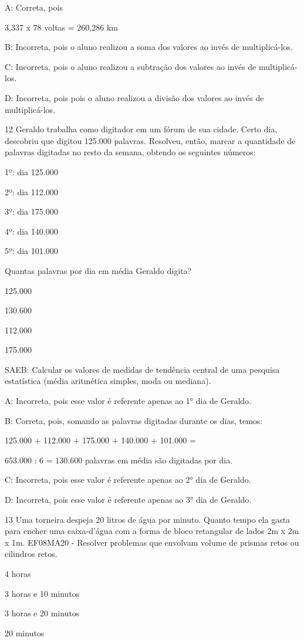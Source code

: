 {A: Correta, pois

3,337 x 78 voltas = 260,286 km

B: Incorreta, pois o aluno realizou a soma dos valores ao invés de
multiplicá-los.

C: Incorreta, pois o aluno realizou a subtração dos valores ao invés de
multiplicá-los.

D: Incorreta, pois pois o aluno realizou a divisão dos valores ao invés
de multiplicá-los.

\num{12} Geraldo trabalha como digitador em um fórum de sua cidade. Certo
dia, descobriu que digitou 125.000 palavras. Resolveu, então, marcar a
quantidade de palavras digitadas no resto da semana, obtendo os
seguintes números:

1º: dia 125.000

2º: dia 112.000

3º: dia 175.000

4º: dia 140.000

5º: dia 101.000

Quantas palavras por dia em média Geraldo digita?
\item 125.000
\item 130.600
\item 112.000
\item 175.000

SAEB: Calcular os valores de medidas de tendência central de uma
pesquisa estatística (média aritmética simples, moda ou mediana).

A: Incorreta, pois esse valor é referente apenas ao 1° dia de Geraldo.

B: Correta, pois, somando as palavras digitadas durante os dias, temos:

125.000 + 112.000 + 175.000 + 140.000 + 101.000 =

653.000 : 6 = 130.600 palavras em média são digitadas por dia.

C: Incorreta, pois esse valor é referente apenas ao 2° dia de Geraldo.

D: Incorreta, pois esse valor é referente apenas ao 3° dia de Geraldo.

\num{13} Uma torneira despeja 20 litros de água por minuto. Quanto tempo ela
gasta para encher uma caixa-d'água com a forma de bloco retangular de
lados 2m x 2m x 1m. EF08MA20 - Resolver problemas que envolvam volume de
prismas retos ou cilindros retos.
\item 4 horas
\item 3 horas e 10 minutos
\item 3 horas e 20 minutos
\item 20 minutos

}
